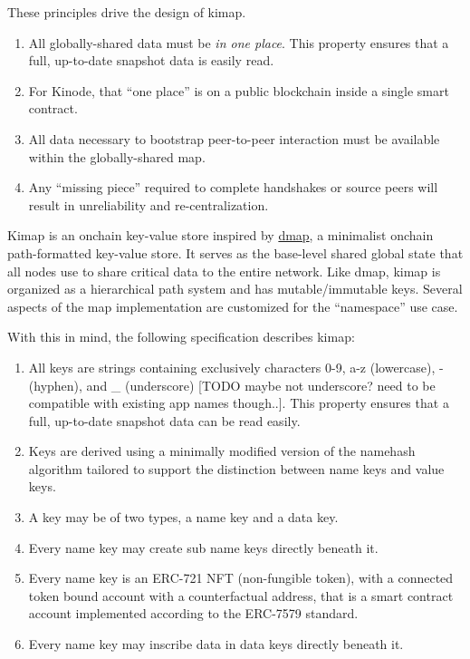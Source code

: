 \documentclass[runningheads]{llncs}
\begin{document}
These principles drive the design of kimap.
\begin{enumerate}
    \item All globally-shared data must be \textit{in one place}.
    This property ensures that a full, up-to-date snapshot data is easily read.
    \item For Kinode, that ``one place'' is on a public blockchain inside a single smart contract.
    \item All data necessary to bootstrap peer-to-peer interaction must be available within the globally-shared map.
    \item Any ``missing piece'' required to complete handshakes or source peers will result in unreliability and re-centralization.
\end{enumerate}

Kimap is an onchain key-value store inspired by \href{https://github.com/dapphub/dmap}{dmap}, a minimalist onchain path-formatted key-value store.
It serves as the base-level shared global state that all nodes use to share critical data to the entire network.
Like dmap, kimap is organized as a hierarchical path system and has mutable/immutable keys.
Several aspects of the map implementation are customized for the ``namespace'' use case.

With this in mind, the following specification describes kimap:

\begin{enumerate}
    \item All keys are strings containing exclusively characters 0-9, a-z (lowercase), - (hyphen), and \_ (underscore) [TODO maybe not underscore? need to be compatible with existing app names though..].
    This property ensures that a full, up-to-date snapshot data can be read easily.
    \item Keys are derived using a minimally modified version of the namehash algorithm tailored to support the distinction between name keys and value keys.
    \item A key may be of two types, a name key and a data key.
    \item Every name key may create sub name keys directly beneath it.
    \item Every name key is an ERC-721 NFT (non-fungible token),
    with a connected token bound account with a counterfactual address,
    that is a smart contract account implemented according to the ERC-7579 standard.
    \item Every name key may inscribe data in data keys directly beneath it.
\end{enumerate}
\end{document}
